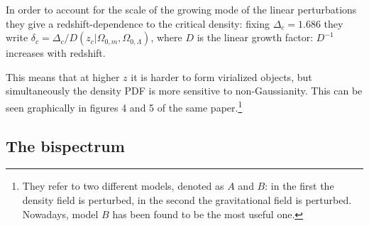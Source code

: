 \documentclass[main.tex]{subfiles}
\begin{document}


In order to account for the scale of the growing mode of the linear perturbations they give a redshift-dependence to the critical density: fixing \(\Delta _c = \num{1.686}\) they write \(\delta _c = \Delta _c / D(z_c  | \Omega_{0, m}, \Omega_{0, \Lambda })\), where \(D\) is the linear growth factor: \(D^{-1}\) increases with redshift. 

This means that at higher \(z\) it is harder to form virialized objects, but simultaneously the density PDF is more sensitive to non-Gaussianity.
This can be seen graphically in figures 4 and 5 of the same paper.\footnote{They refer to two different models, denoted as \(A\) and \(B\): in the first the density field is perturbed, in the second the gravitational field is perturbed. Nowadays, model \(B\) has been found to be the most useful one.}




\subsection{The bispectrum}
\end{document}
